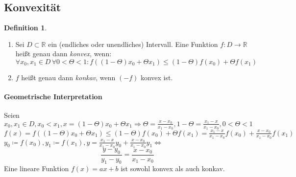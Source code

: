 \documentclass[ngerman,titlepage,twoside, parskip=half*]{scrreprt}
\newcommand*{\R}{\mathbb{R}}
\theoremstyle{plain}
\theoremstyle{definition}
\newtheorem{definition}{Definition}
\theoremstyle{remark}
\begin{document}
\subsection{Konvexität}
\begin{definition}
  \begin{enumerate}[(1)]
    \item Sei $D\subset\R$ ein (endliches oder unendliches) Intervall.
      Eine Funktion $f\colon D\rightarrow\R$ heißt genau dann \emph{konvex}, wenn:
      \[\forall x_0,x_1\in D\,\forall 0<\Theta<1\colon f( (1-\Theta)x_0+\Theta x_1)\leq(1-\Theta)f(x_0)+\Theta f(x_1)\]
    \item $f$ heißt genau dann
      \emph{konkav}, wenn $(-f)$
      konvex ist.
  \end{enumerate}
\end{definition}
  
\paragraph{Geometrische Interpretation}
Seien $x_0,x_1\in D, x_0<x_1, x=(1-\Theta)x_0+\Theta x_1\Rightarrow
\Theta=\frac{x-x_0}{x_1-x_0}, 1-\Theta=\frac{x_1-x}{x_1-x_0}, 0<\Theta<1$\\
$f(x)=f( (1-\Theta)x_0+\Theta x_1)\leq (1-\Theta)f(x_0)+\Theta f(x_1)
=\frac{x_1-x}{x_1-x_0}f(x_0)+\frac{x-x_0}{x_1-x_0}f(x_1)$\\
$y_0\coloneqq f(x_0), y_1\coloneqq f(x_1), y=\frac{x_1-x}{x_1-x_0}y_0+\frac{x-x_0}{x_1-x_0}y_1
\Leftrightarrow$
\[\frac{y-y_0}{y_1-y_0}=\frac{x-x_0}{x_1-x_0}\]
Eine lineare Funktion $f(x)=ax+b$ ist sowohl konvex als auch konkav.
\end{document}
